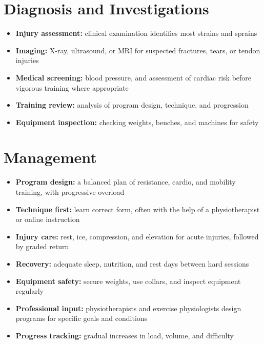 \section*{Diagnosis and Investigations}
\begin{itemize}
    \item \textbf{Injury assessment:} clinical examination identifies most strains and sprains
    \item \textbf{Imaging:} X-ray, ultrasound, or MRI for suspected fractures, tears, or tendon injuries
    \item \textbf{Medical screening:} blood pressure, and assessment of cardiac risk before vigorous training where appropriate
    \item \textbf{Training review:} analysis of program design, technique, and progression
    \item \textbf{Equipment inspection:} checking weights, benches, and machines for safety
\end{itemize}

\section*{Management}
\begin{itemize}
    \item \textbf{Program design:} a balanced plan of resistance, cardio, and mobility training, with progressive overload
    \item \textbf{Technique first:} learn correct form, often with the help of a physiotherapist or online instruction
    \item \textbf{Injury care:} rest, ice, compression, and elevation for acute injuries, followed by graded return
    \item \textbf{Recovery:} adequate sleep, nutrition, and rest days between hard sessions
    \item \textbf{Equipment safety:} secure weights, use collars, and inspect equipment regularly
    \item \textbf{Professional input:} physiotherapists and exercise physiologists design programs for specific goals and conditions
    \item \textbf{Progress tracking:} gradual increases in load, volume, and difficulty
\end{itemize}

